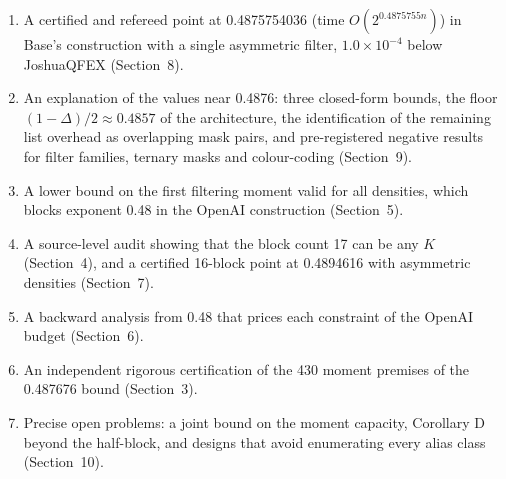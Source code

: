 \documentclass[11pt]{article}
\theoremstyle{plain}
\begin{document}
\begin{enumerate}
\item A certified and refereed point at 0.4875754036 (time $O(2^{0.4875755n})$) in Base's construction with a single asymmetric filter, $1.0\times10^{-4}$ below JoshuaQFEX (Section~8).
\item An explanation of the values near 0.4876: three closed-form bounds, the floor $(1 - \Delta)/2 \approx 0.4857$ of the architecture, the identification of the remaining list overhead as overlapping mask pairs, and pre-registered negative results for filter families, ternary masks and colour-coding (Section~9).
\item A lower bound on the first filtering moment valid for all densities, which blocks exponent 0.48 in the OpenAI construction (Section~5).
\item A source-level audit showing that the block count 17 can be any $K$ (Section~4), and a certified 16-block point at 0.4894616 with asymmetric densities (Section~7).
\item A backward analysis from 0.48 that prices each constraint of the OpenAI budget (Section~6).
\item An independent rigorous certification of the 430 moment premises of the 0.487676 bound (Section~3).
\item Precise open problems: a joint bound on the moment capacity, Corollary D beyond the half-block, and designs that avoid enumerating every alias class (Section~10).
\end{enumerate}
\end{document}
